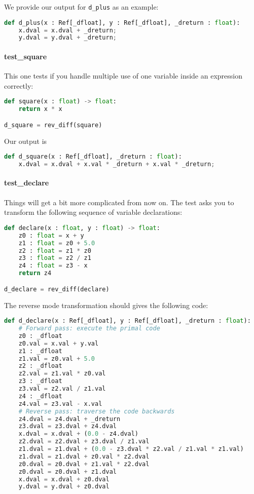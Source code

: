 We provide our output for \lstinline{d_plus} as an example:
\begin{lstlisting}[language=Python]
def d_plus(x : Ref[_dfloat], y : Ref[_dfloat], _dreturn : float):
	x.dval = x.dval + _dreturn;
	y.dval = y.dval + _dreturn;
\end{lstlisting}

\paragraph{test_square} This one tests if you handle multiple use of one variable inside an expression correctly:
\begin{lstlisting}[language=Python]
def square(x : float) -> float:
    return x * x

d_square = rev_diff(square)
\end{lstlisting}
Our output is
\begin{lstlisting}[language=Python]
def d_square(x : Ref[_dfloat], _dreturn : float):
	x.dval = x.dval + x.val * _dreturn + x.val * _dreturn;
\end{lstlisting}

\paragraph{test_declare} Things will get a bit more complicated from now on. The test asks you to transform the following sequence of variable declarations:
\begin{lstlisting}[language=Python]
def declare(x : float, y : float) -> float:
    z0 : float = x + y
    z1 : float = z0 + 5.0
    z2 : float = z1 * z0
    z3 : float = z2 / z1
    z4 : float = z3 - x
    return z4

d_declare = rev_diff(declare)
\end{lstlisting}
The reverse mode transformation should gives the following code:
\begin{lstlisting}[language=Python]
def d_declare(x : Ref[_dfloat], y : Ref[_dfloat], _dreturn : float):
	# Forward pass: execute the primal code
	z0 : _dfloat
	z0.val = x.val + y.val
	z1 : _dfloat
	z1.val = z0.val + 5.0
	z2 : _dfloat
	z2.val = z1.val * z0.val
	z3 : _dfloat
	z3.val = z2.val / z1.val
	z4 : _dfloat
	z4.val = z3.val - x.val
	# Reverse pass: traverse the code backwards
	z4.dval = z4.dval + _dreturn
	z3.dval = z3.dval + z4.dval
	x.dval = x.dval + (0.0 - z4.dval)
	z2.dval = z2.dval + z3.dval / z1.val
	z1.dval = z1.dval + (0.0 - z3.dval * z2.val / z1.val * z1.val)
	z1.dval = z1.dval + z0.val * z2.dval
	z0.dval = z0.dval + z1.val * z2.dval
	z0.dval = z0.dval + z1.dval
	x.dval = x.dval + z0.dval
	y.dval = y.dval + z0.dval
\end{lstlisting}


